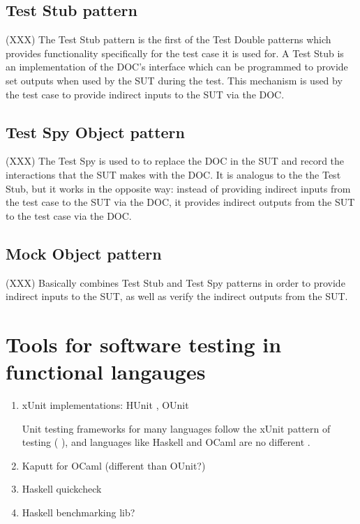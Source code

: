 
\subsection{Test Stub pattern}
\label{testdoubles:stub}

(XXX) The Test Stub pattern is the first of the Test Double patterns
which provides functionality specifically for the test case it is used
for. A Test Stub is an implementation of the DOC's interface which can
be programmed to provide set outputs when used by the SUT during the
test. This mechanism is used by the test case to provide indirect
inputs to the SUT via the DOC.


\subsection{Test Spy Object pattern}
\label{testdoubles:spy}

(XXX) The Test Spy is used to to replace the DOC in the SUT and record
the interactions that the SUT makes with the DOC. It is analogus to
the the Test Stub, but it works in the opposite way: instead of
providing indirect inputs from the test case to the SUT via the DOC,
it provides indirect outputs from the SUT to the test case via the
DOC.

\subsection{Mock Object pattern}
\label{testdoubles:mocks}

(XXX) Basically combines Test Stub and Test Spy patterns in order to
provide indirect inputs to the SUT, as well as verify the indirect
outputs from the SUT.

\section{Tools for software testing in functional langauges}
\label{testtools}

\begin{enumerate}
\item xUnit implementations: HUnit \cite{www:hunit}, OUnit \cite{www:ounit}

Unit testing frameworks for many languages follow the xUnit pattern of
testing (\cite{junit} \cite{www:nunit} \cite{www:ruby:unit}), and
languages like Haskell and OCaml are no different \cite{www:hunit}
\cite{www:ounit}.

\item Kaputt for OCaml \cite{www:kaputt} (different than OUnit?)

\item Haskell quickcheck \cite{claessen:quickcheck}
\item Haskell benchmarking lib? \cite{www:criterion}
\end{enumerate}
